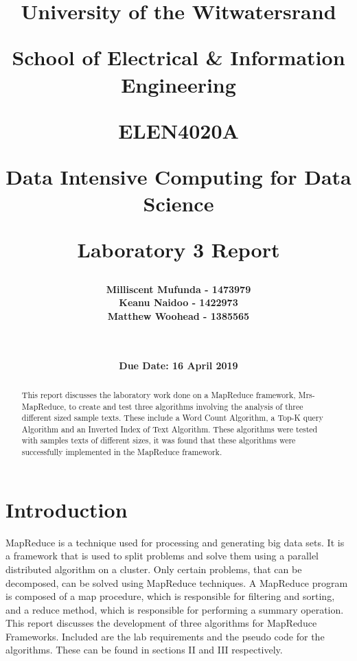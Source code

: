 \documentclass[twocolumn, 11pt]{IEEEtran}
\title{ \Large \bf University of the Witwatersrand \centerline{School of Electrical \& Information Engineering} \newline \newline \newline \newline \newline \newline \LARGE \bf ELEN4020A  \centerline{Data Intensive Computing for Data Science} \newline \centerline{Laboratory 3 Report} \newline}
\date{\LARGE \bf Due Date: 16 April 2019}
\author{ \LARGE \bf Milliscent Mufunda - 1473979 \\ \LARGE \bf Keanu Naidoo - 1422973 \\ \LARGE \bf Matthew Woohead -  1385565\\ \\ \\}
\begin{document}
\begin{titlingpage}
\maketitle

\end{titlingpage}

\setcounter{page}{1}

\begin{abstract}
    
This report discusses the laboratory work done on a MapReduce framework, Mrs-MapReduce, to create and test three algorithms involving the analysis of three different sized sample texts. These include a Word Count Algorithm, a Top-K query Algorithm and an Inverted Index of Text Algorithm. These algorithms were tested with samples texts of different sizes, it was found that these algorithms were successfully implemented in the MapReduce framework.

    
\end{abstract}

\section{Introduction}

MapReduce is a technique used for processing and generating big data sets. It is a framework that is used to split problems and solve them using a parallel distributed algorithm on a cluster. Only certain problems, that can be decomposed, can be solved using MapReduce techniques. A MapReduce program is composed of a map procedure, which is responsible for filtering and sorting, and a reduce method, which is responsible for performing a summary operation. This report discusses the development of three algorithms for MapReduce Frameworks. Included are the lab requirements and the pseudo code for the algorithms. These can be found in sections II and III respectively. 
\end{document}
